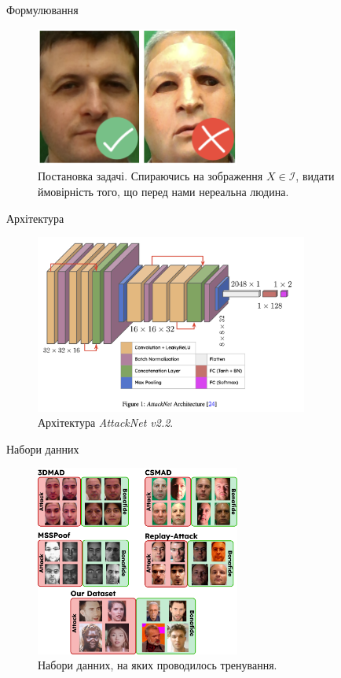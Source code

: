 \documentclass{zkdl-presentation-template}
\begin{document}
    \begin{frame}{Формулювання}
        \begin{figure}
        \centering
            \includegraphics[width=0.6\textwidth]{images/statement.png}
            \caption{Постановка задачі. Спираючись на зображення $X \in \mathcal{I}$, видати ймовірність того, що перед нами нереальна людина.}
        \end{figure}
    \end{frame}

    \begin{frame}{Архітектура}
        \begin{figure}
        \centering
            \includegraphics[width=0.8\textwidth]{images/attacknet.png}
            \caption{Архітектура \textit{AttackNet v2.2}.}
        \end{figure}
    \end{frame}

    \begin{frame}{Набори данних}
        \begin{figure}
        \centering
            \includegraphics[width=0.6\textwidth]{images/anti_datasets.png}
            \caption{Набори данних, на яких проводилось тренування.}
        \end{figure}
    \end{frame}
\end{document}
